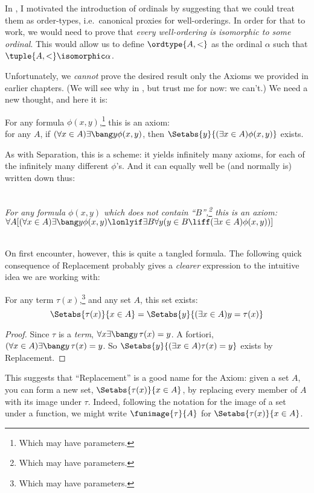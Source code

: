 \documentclass[../../../include/open-logic-section]{subfiles}
\begin{document}
In , I motivated the introduction of ordinals by suggesting that we could treat them as order-types, i.e.\ canonical proxies for well-orderings. In order for that to work, we would need to prove that \emph{every well-ordering is isomorphic to some ordinal}. This would allow us to define $\ordtype{A, <}$ as the ordinal $\alpha$ such that $\tuple{A, <} \isomorphic \alpha$. 

Unfortunately, we \emph{cannot} prove the desired result only the Axioms we provided in earlier chapters. (We will see why in , but trust me for now: we can't.) We need a new thought, and here it is:
\begin{axiom*} For any formula $\phi(x, y)$,\footnote{Which may have parameters.} this is an axiom: 
	\\for any $A$, if $(\forall x \in A)\exists\bang y\phi(x,y)$, {then} $\Setabs{y}{(\exists x \in A)\phi(x,y)}$ exists.
\end{axiom*}\noindent
As with Separation, this is a scheme: it yields infinitely many axioms, for each of the infinitely many different $\phi$'s. And it can equally well be (and normally is) written down thus:

\
\\\emph{For any formula $\phi(x,y)$ which does not contain ``$B$'',\footnote{Which may have parameters.} this is an axiom:
\\$\forall A[(\forall x \in A)\exists \bang y \phi(x,y) \lonlyif \exists B\forall y (y \in B \liff (\exists x \in A)\phi(x,y))]$}

\
\\ 
On first encounter, however, this is quite a tangled formula. The following quick consequence of Replacement probably gives a \emph{clearer} expression to the intuitive idea we are working with:
\begin{cor}For any term $\tau(x)$,\footnote{Which may have parameters.} and any set $A$, this set exists:
$$\Setabs{\tau(x)}{x \in A} = \Setabs{y}{(\exists x \in A)y = \tau(x)}$$
\end{cor}
\begin{proof}
	Since $\tau$ is a \emph{term}, $\forall x \exists \bang y\,  \tau(x) = y$. A fortiori, $(\forall x \in A)\exists\bang y\, \tau(x) = y$. So $\Setabs{y}{(\exists x \in A)\tau(x) = y}$ exists by Replacement.
\end{proof}\noindent
This suggests that ``Replacement'' is a good name for the Axiom: given a set $A$, you can form a new set, $\Setabs{\tau(x)}{x \in A}$, by replacing every member of $A$ with its image under $\tau$. Indeed, following the notation for the image of a set under a function, we might write $\funimage{\tau}{A}$ for $\Setabs{\tau(x)}{x \in A}$.
\end{document}
